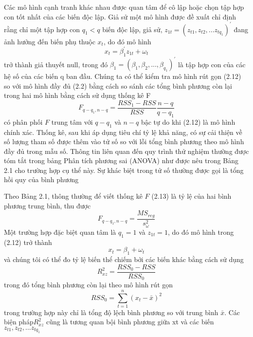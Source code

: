 \documentclass[12pt, a4paper,oneside]{book}
\theoremstyle{definition}
\begin{document}
Các mô hình cạnh tranh khác nhau được quan tâm để cô lập hoặc chọn tập hợp con tốt nhất của các biến độc lập. Giả sử một mô hình được đề xuất chỉ định rằng chỉ một tập hợp con $ q_{1}< q $ biến độc lập, giả sử, $z_{1t}=(z_{t1}, z_{t2},...z_{tq_{1}})^{'}$ đang ảnh hưởng đến biến phụ thuộc $ x_{t} $, do đó mô hình 
$$x_{t}=\beta_{1}^{'}z_{1t}+\omega_{t}$$
trở thành giả thuyết null, trong đó $\beta_{1}=(\beta_{1},\beta_{2},...,\beta_{q_{1}})^{'}$ là tập hợp con của các hệ số của các biến q ban đầu. Chúng ta có thể kiểm tra mô hình rút gọn (2.12) so với mô hình đầy đủ (2.2) bằng cách so sánh các tổng bình phương còn lại trong hai mô hình bằng cách sử dụng thống kê F
$$F_{q-q_{1}, n-q}=\frac{RSS_{1}-RSS}{RSS}\dfrac{n-q}{q-q_{1}}$$
có phân phối $ F $ trung tâm với $ q-q_{1} $ và $ n-q $ bậc tự do khi (2.12) là mô hình chính xác. Thống kê, sau khi áp dụng tiêu chí tỷ lệ khả năng, có sự cải thiện về số lượng tham số được thêm vào tử số so với lỗi  tổng bình phương theo mô hình đầy đủ trong mẫu số. Thông tin liên quan đến quy trình thử nghiệm thường được tóm tắt trong bảng Phân tích phương sai (ANOVA) như được nêu trong Bảng 2.1 cho trường hợp cụ thể này. Sự khác biệt trong tử số thường được gọi là tổng hồi quy của bình phương 

Theo Bảng 2.1, thông thường để viết thống kê $ F $ (2.13) là tỷ lệ của hai bình phương trung bình, thu được
$$F_{q-q_{1}, n-q}=\frac{MS_{reg}}{s_{\omega}^{2}}$$
Một trường hợp đặc biệt quan tâm là $ q_{1}=1 $ và $ z_{1t}=1 $, do đó mô hình trong (2.12) trở thành
$$ x_{t}=\beta_{1} + \omega_{t} $$
và chúng tôi có thể đo tỷ lệ biến thể chiếm bởi các biến khác bằng cách sử dụng
$$R_{xz}^{2}=\dfrac{RSS_{0}-RSS}{RSS_{0}}$$
trong đó tổng bình phương còn lại theo mô hình rút gọn
$$RSS_{0}= \sum_{t=1}^{n} (x_{t}-\bar{x})^{2}$$
trong trường hợp này chỉ là tổng độ lệch bình phương so với trung bình $\bar{x}$. Các biện pháp$ R_{xz}^{2} $ cũng là tương quan bội bình phương giữa xt và các biến $ z_{t1}, z_{t2},...z_{tq_{1}} $
\end{document}
